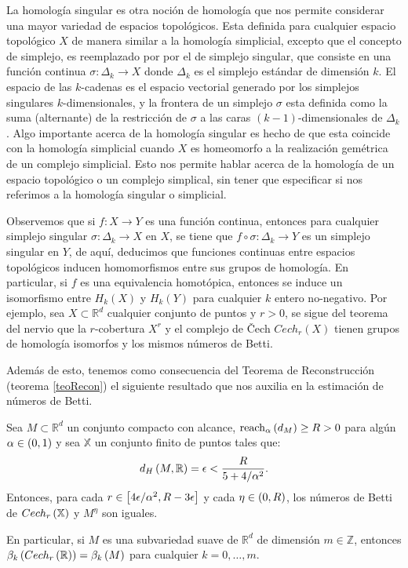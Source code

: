 La homolog\'ia singular es otra noci\'on de homolog\'ia que nos permite considerar una mayor variedad de
espacios topol\'ogicos. Esta definida para cualquier espacio topol\'ogico $X$ de manera similar a la
homolog\'ia simplicial, excepto que el concepto de simplejo, es reemplazado por por el de simplejo
singular, que consiste en una funci\'on continua $\sigma: \Delta_{k}\rightarrow X$ donde $\Delta_{k}$
es el simplejo est\'andar de dimensi\'on $k$. El espacio de las $k$-cadenas es el espacio
vectorial generado por los simplejos singulares $k$-dimensionales, y la frontera de un simplejo $\sigma$
esta definida como la suma (alternante) de la restricci\'on de $\sigma$ a las caras $(k-1)$-dimensionales
de $\Delta_{k}$. Algo importante acerca de la homolog\'ia singular es hecho de que esta coincide con
la homolog\'ia simplicial cuando $X$ es homeomorfo a la realizaci\'on gem\'etrica de un complejo
simplicial. Esto nos permite hablar acerca de la homolog\'ia de un espacio topol\'ogico o un complejo
simplical, sin tener que especificar si nos referimos a la homolog\'ia singular o simplicial.

Observemos que si $f:X\rightarrow Y$ es una funci\'on continua, entonces para cualquier simplejo singular
$\sigma:\Delta_{k}\rightarrow X$ en $X$, se tiene que $f\circ\sigma:\Delta_{k}\rightarrow Y$ es un
simplejo singular en $Y$, de aqu\'i, deducimos que funciones continuas entre espacios topol\'ogicos
inducen homomorfismos entre sus grupos de homolog\'ia. En particular, si $f$ es una equivalencia
homot\'opica, entonces se induce un isomorfismo entre $H_{k}\left(X\right)$ y $H_{k}\left(Y\right)$ para
cualquier $k$ entero no-negativo. Por ejemplo, sea $X\subset \mathbb{R}^{d}$ cualquier conjunto de puntos
y $r>0$, se sigue del teorema del nervio que la $r$-cobertura $X^{r}$ y el complejo de \v Cech
$Cech_{r}\left(X\right)$ tienen grupos de homolog\'ia isomorfos y los mismos n\'umeros de Betti.


Adem\'as de esto, tenemos como consecuencia del Teorema de Reconstrucci\'on (teorema \ref{teoRecon}) el siguiente
resultado que nos auxilia en la estimaci\'on de n\'umeros de Betti.

\begin{teorema}
    Sea $M \subset \mathbb{R}^{d}$ un conjunto compacto con alcance,
    $\mathrm{reach}_{\alpha}\left(d_{M}\right)\geq R > 0$ para alg\'un $\alpha\in\left(0, 1\right)$ y sea $\mathbb{X}$
    un conjunto finito de puntos tales que:
    \begin{equation*}
        d_{H}\left(M, \mathbb{R}\right)=\epsilon < \frac{R}{5+4/\alpha^{2}}.
    \end{equation*}
    Entonces, para cada $r\in\left[4\epsilon/\alpha^{2}, R-3\epsilon\right]$ y cada $\eta\in\left(0, R\right)$,
    los n\'umeros de Betti de $Cech_{r}\left(\mathbb{X}\right)$ y $M^{\eta}$ son iguales.
    
    En particular, si $M$ es una subvariedad suave de $\mathbb{R}^{d}$ de dimensi\'on $m\in\mathbb{Z}$,
    entonces $\beta_{k}\left(Cech_{r}\left(\mathbb{R}\right)\right)=\beta_{k}\left(M\right)$ para cualquier $k=0, \dots, m$.
\end{teorema}

